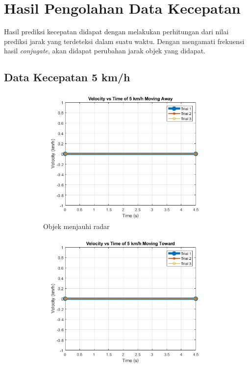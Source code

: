 \section{Hasil Pengolahan Data Kecepatan}

Hasil prediksi kecepatan didapat dengan melakukan perhitungan dari nilai prediksi jarak yang terdeteksi dalam suatu waktu. Dengan mengamati frekuensi hasil \textit{conjugate}, akan didapat perubahan jarak objek yang didapat. 

\subsection{Data Kecepatan 5 km/h}

\begin{figure}
    \centering
    \begin{subfigure}[b]{0.45\textwidth}
        \centering
		\includegraphics[scale=0.4]{pics/bab5/Velocity/5MA.jpg}
		\caption{Objek menjauhi radar}
		\label{fig:pengambilan5MA}
    \end{subfigure}
    \hfill
    \begin{subfigure}[b]{0.45\textwidth}
        \centering
		\includegraphics[scale=0.4]{pics/bab5/Velocity/5MT.jpg}

\end{subfigure}
\end{figure}
